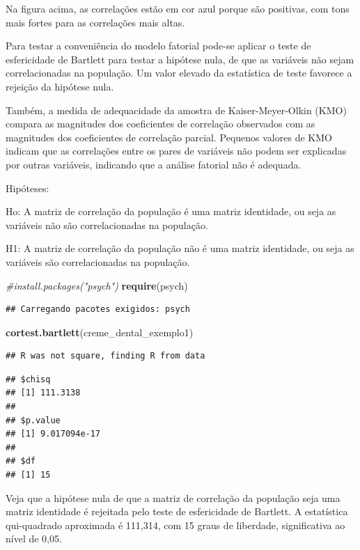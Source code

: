 \documentclass[12pt,brazil,]{book}
\newenvironment{Shaded}{\begin{snugshade}}{\end{snugshade}}
\newcommand{\CommentTok}[1]{\textcolor[rgb]{0.56,0.35,0.01}{\textit{#1}}}
\newcommand{\KeywordTok}[1]{\textcolor[rgb]{0.13,0.29,0.53}{\textbf{#1}}}
\newcommand{\NormalTok}[1]{#1}
\begin{document}
Na figura acima, as correlações estão em cor azul porque são positivas,
com tons mais fortes para as correlações mais altas.

Para testar a conveniência do modelo fatorial pode-se aplicar o teste de
esfericidade de Bartlett para testar a hipótese nula, de que as
variáveis não sejam correlacionadas na população. Um valor elevado da
estatística de teste favorece a rejeição da hipótese nula.

Também, a medida de adequacidade da amostra de Kaiser-Meyer-Olkin (KMO)
compara as magnitudes dos coeficientes de correlação observados com as
magnitudes dos coeficientes de correlação parcial. Pequenos valores de
KMO indicam que as correlações entre os pares de variáveis não podem ser
explicadas por outras variáveis, indicando que a análise fatorial não é
adequada.

Hipóteses:

Ho: A matriz de correlação da população é uma matriz identidade, ou seja
as variáveis não são correlacionadas na população.

H1: A matriz de correlação da população não é uma matriz identidade, ou
seja as variáveis são correlacionadas na população.

\begin{Shaded}
\begin{Highlighting}[]
\CommentTok{#install.packages("psych")}
\KeywordTok{require}\NormalTok{(psych)}
\end{Highlighting}
\end{Shaded}

\begin{verbatim}
## Carregando pacotes exigidos: psych
\end{verbatim}

\begin{Shaded}
\begin{Highlighting}[]
\KeywordTok{cortest.bartlett}\NormalTok{(creme_dental_exemplo1)}
\end{Highlighting}
\end{Shaded}

\begin{verbatim}
## R was not square, finding R from data
\end{verbatim}

\begin{verbatim}
## $chisq
## [1] 111.3138
## 
## $p.value
## [1] 9.017094e-17
## 
## $df
## [1] 15
\end{verbatim}

Veja que a hipótese nula de que a matriz de correlação da população seja
uma matriz identidade é rejeitada pelo teste de esfericidade de
Bartlett. A estatística qui-quadrado aproximada é 111,314, com 15 graus
de liberdade, significativa ao nível de 0,05.
\end{document}
